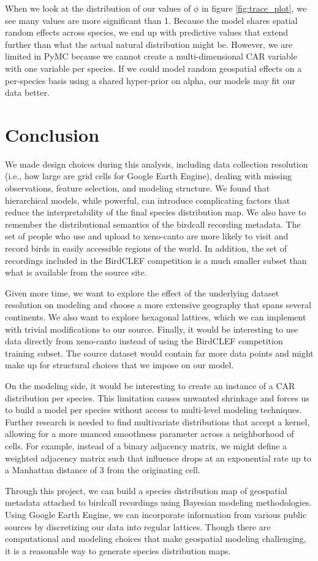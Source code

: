 \documentclass[notitlepage]{article}
\begin{document}
When we look at the distribution of our values of $\phi$ in figure \ref{fig:trace_plot}, we see many values are more significant than 1.
Because the model shares spatial random effects across species, we end up with predictive values that extend further than what the actual natural distribution might be.
However, we are limited in PyMC because we cannot create a multi-dimensional CAR variable with one variable per species.
If we could model random geospatial effects on a per-species basis using a shared hyper-prior on alpha, our models may fit our data better.


\section{Conclusion}

We made design choices during this analysis, including data collection resolution (i.e., how large are grid cells for Google Earth Engine), dealing with missing observations, feature selection, and modeling structure.
We found that hierarchical models, while powerful, can introduce complicating factors that reduce the interpretability of the final species distribution map.
We also have to remember the distributional semantics of the birdcall recording metadata.
The set of people who use and upload to xeno-canto are more likely to visit and record birds in easily accessible regions of the world.
In addition, the set of recordings included in the BirdCLEF competition is a much smaller subset than what is available from the source site.

Given more time, we want to explore the effect of the underlying dataset resolution on modeling and choose a more extensive geography that spans several continents.
We also want to explore hexagonal lattices, which we can implement with trivial modifications to our source.
Finally, it would be interesting to use data directly from xeno-canto instead of using the BirdCLEF competition training subset.
The source dataset would contain far more data points and might make up for structural choices that we impose on our model.

On the modeling side, it would be interesting to create an instance of a CAR distribution per species.
This limitation causes unwanted shrinkage and forces us to build a model per species without access to multi-level modeling techniques.
Further research is needed to find multivariate distributions that accept a kernel, allowing for a more nuanced smoothness parameter across a neighborhood of cells.
For example, instead of a binary adjacency matrix, we might define a weighted adjacency matrix such that influence drops at an exponential rate up to a Manhattan distance of 3 from the originating cell.

Through this project, we can build a species distribution map of geospatial metadata attached to birdcall recordings using Bayesian modeling methodologies.
Using Google Earth Engine, we can incorporate information from various public sources by discretizing our data into regular lattices.
Though there are computational and modeling choices that make geospatial modeling challenging, it is a reasonable way to generate species distribution maps.

\printbibliography
\end{document}
